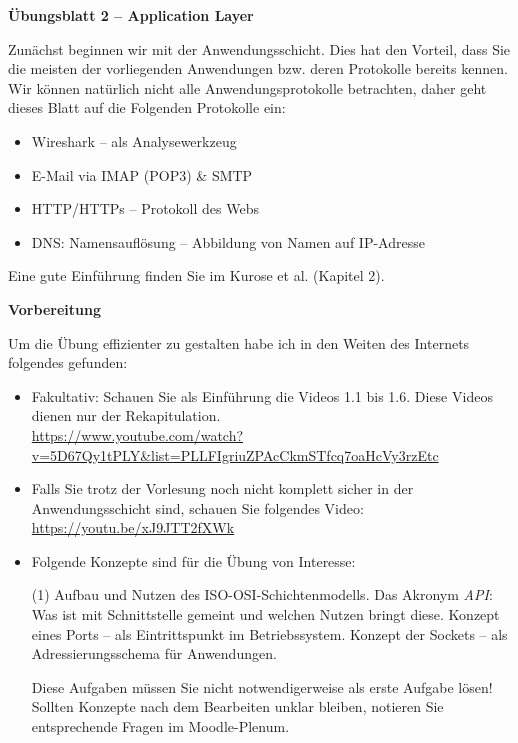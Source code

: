 \documentclass[paper=a4,fontsize=11pt]{scrartcl}%
\numberwithin{equation}{section}
\begin{document}
\begin{center}
\Large{\textbf{Übungsblatt 2 -- Application Layer}}
\end{center}
Zunächst beginnen wir mit der Anwendungsschicht. Dies hat den Vorteil, dass Sie die meisten der vorliegenden Anwendungen bzw. deren Protokolle bereits kennen. Wir können natürlich nicht alle Anwendungsprotokolle betrachten, daher geht dieses Blatt auf die Folgenden Protokolle ein:
\begin{itemize}
	\item Wireshark -- als Analysewerkzeug
	\item E-Mail via IMAP (POP3) \& SMTP
	\item HTTP/HTTPs -- Protokoll des Webs
	\item DNS: Namensauflösung -- Abbildung von Namen auf IP-Adresse
\end{itemize}
Eine gute Einführung finden Sie im Kurose et al. \cite[S. 83]{Kurose2012} (Kapitel 2).

\begin{center}\Large{\textbf{Vorbereitung}}\end{center}\vskip0.25in
Um die Übung effizienter zu gestalten habe ich in den Weiten des Internets folgendes gefunden:\\
\begin{itemize}
	\item Fakultativ: Schauen Sie als Einführung die Videos 1.1 bis 1.6. Diese Videos dienen nur der Rekapitulation.\\
	\url{https://www.youtube.com/watch?v=5D67Qy1tPLY&list=PLLFIgriuZPAcCkmSTfcq7oaHcVy3rzEtc}
	\item Falls Sie trotz der Vorlesung noch nicht komplett sicher in der Anwendungsschicht sind, schauen Sie folgendes Video:
	\url{https://youtu.be/xJ9JTT2fXWk}
	\item Folgende Konzepte sind für die Übung von Interesse:
	\begin{tasks}(1)
		\task Aufbau und Nutzen des ISO-OSI-Schichtenmodells.
		\task Das Akronym \emph{API}: Was ist mit Schnittstelle gemeint und welchen Nutzen bringt diese.
		\task Konzept eines Ports -- als Eintrittspunkt im Betriebssystem.
		\task Konzept der Sockets -- als Adressierungsschema für Anwendungen.
	\end{tasks}
	Diese Aufgaben müssen Sie nicht notwendigerweise als erste Aufgabe lösen! Sollten Konzepte nach dem Bearbeiten unklar bleiben, notieren Sie entsprechende Fragen im Moodle-Plenum.
\end{itemize}
\end{document}
